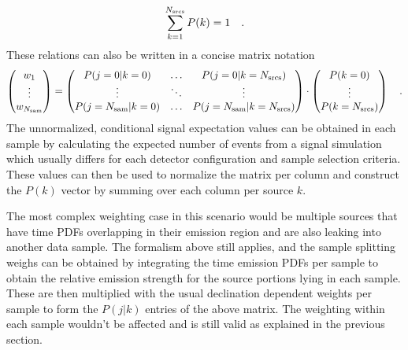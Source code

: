\begin{equation}
  \sum_{k=1}^{N_\text{srcs}} P(k) = 1
  \quad\text{.}
\end{equation}
These relations can also be written in a concise matrix notation
\begin{equation}
  \begin{pmatrix} w_1 \\ \vdots \\ w_{N_\text{sam}} \end{pmatrix} =
    \begin{pmatrix}
      P(j=0|k=0) & \dots & P(j=0|k=N_\text{srcs}) \\
      \vdots & \ddots & \vdots \\
      P(j=N_\text{sam}|k=0) & \dots & P(j=N_\text{sam}|k=N_\text{srcs})
    \end{pmatrix} \cdot
    \begin{pmatrix}
      P(k=0) \\ \vdots \\ P(k=N_\text{srcs})
    \end{pmatrix}
  \quad\text{.}
\end{equation}
The unnormalized, conditional signal expectation values can be obtained in each sample by calculating the expected number of events from a signal simulation which usually differs for each detector configuration and sample selection criteria.
These values can then be used to normalize the matrix per column and construct the $P(k)$ vector by summing over each column per source $k$.

The most complex weighting case in this scenario would be multiple sources that have time PDFs overlapping in their emission region and are also leaking into another data sample.
The formalism above still applies, and the sample splitting weighs can be obtained by integrating the time emission PDFs per sample to obtain the relative emission strength for the source portions lying in each sample.
These are then multiplied with the usual declination dependent weights per sample to form the $P(j|k)$ entries of the above matrix.
The weighting within each sample wouldn't be affected and is still valid as explained in the previous section.

